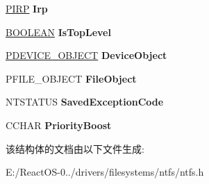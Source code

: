 \begin{DoxyCompactItemize}
\hyperlink{interfacevoid}{P\+I\+RP} {\bfseries Irp}
\item 
\mbox{\label{struct_n_t_f_s___i_r_p___c_o_n_t_e_x_t_ae791afd60c38d960d4f4cdc260eb9774}} 
\hyperlink{_processor_bind_8h_a112e3146cb38b6ee95e64d85842e380a}{B\+O\+O\+L\+E\+AN} {\bfseries Is\+Top\+Level}
\item 
\mbox{\label{struct_n_t_f_s___i_r_p___c_o_n_t_e_x_t_af9e9fb1d1bf139fc3a768fbfe4744787}} 
\hyperlink{struct___d_e_v_i_c_e___o_b_j_e_c_t}{P\+D\+E\+V\+I\+C\+E\+\_\+\+O\+B\+J\+E\+CT} {\bfseries Device\+Object}
\item 
\mbox{\label{struct_n_t_f_s___i_r_p___c_o_n_t_e_x_t_a40b2e39bf3dbdfd5408634eea6f474d5}} 
P\+F\+I\+L\+E\+\_\+\+O\+B\+J\+E\+CT {\bfseries File\+Object}
\item 
\mbox{\label{struct_n_t_f_s___i_r_p___c_o_n_t_e_x_t_a1b1c799d1332809379b0181407d0aec4}} 
N\+T\+S\+T\+A\+T\+US {\bfseries Saved\+Exception\+Code}
\item 
\mbox{\label{struct_n_t_f_s___i_r_p___c_o_n_t_e_x_t_ac5df70fe6a2cf6a661d929f3314ec0ff}} 
C\+C\+H\+AR {\bfseries Priority\+Boost}
\end{DoxyCompactItemize}


该结构体的文档由以下文件生成\+:\begin{DoxyCompactItemize}
\item 
E\+:/\+React\+O\+S-\/0../drivers/filesystems/ntfs/ntfs.\+h\end{DoxyCompactItemize}
